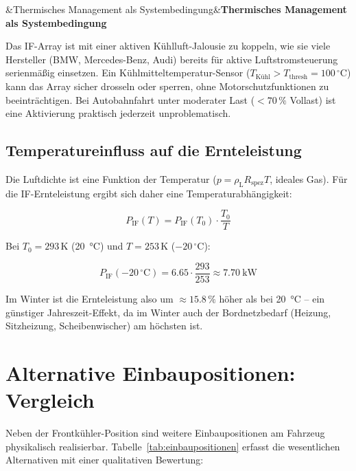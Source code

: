 ﻿\documentclass[12pt, a4paper]{report}
\newenvironment{wichtig}[1][]{%
  \begin{wichtigframe}\sloppy%
  \ifx&#1&\else\textbf{#1}\par\smallskip\fi}{\end{wichtigframe}}
\theoremstyle{definition}
\theoremstyle{remark}
\newcommand{\rhoL}{\rho_{\text{L}}}
\begin{document}
\begin{wichtig}[Thermisches Management als Systembedingung]
  Das IF-Array ist mit einer aktiven Kühlluft-Jalousie zu koppeln, wie sie
  viele Hersteller (BMW, Mercedes-Benz, Audi) bereits für aktive
  Luftstromsteuerung serienmäßig einsetzen. Ein Kühlmitteltemperatur-Sensor
  ($T_{\text{Kühl}} > T_{\text{thresh}} = 100\,^\circ\text{C}$) kann das Array
  sicher drosseln oder sperren, ohne Motorschutzfunktionen zu beeinträchtigen.
  Bei Autobahnfahrt unter moderater Last ($< 70\,\%$ Vollast) ist eine
  Aktivierung praktisch jederzeit unproblematisch.
\end{wichtig}

\subsection{Temperatureinfluss auf die Ernteleistung}

Die Luftdichte ist eine Funktion der Temperatur ($p = \rhoL R_{\text{spez}} T$,
ideales Gas). Für die IF-Ernteleistung ergibt sich daher eine Temperaturabhängigkeit:

\begin{equation}
  P_{\text{IF}}(T) = P_{\text{IF}}(T_0) \cdot \frac{T_0}{T}
  \label{eq:p_if_temp}
\end{equation}

Bei $T_0 = 293\,\text{K}$ (20\, °C) und $T = 253\,\text{K}$ ($-20\,^\circ$C):

\begin{equation}
  P_{\text{IF}}(-20\,^\circ\text{C}) = 6.65 \cdot \frac{293}{253} \approx \SI{7.70}{\kilo\watt}
  \label{eq:p_if_winter}
\end{equation}

Im Winter ist die Ernteleistung also um $\approx 15.8\,\%$ höher als bei
20\, °C -- ein günstiger Jahreszeit-Effekt, da im Winter auch der Bordnetzbedarf
(Heizung, Sitzheizung, Scheiben\-wischer) am höchsten ist.

\section{Alternative Einbaupositionen: Vergleich}
\label{sec:kfz_positionen}

Neben der Frontkühler-Position sind weitere Einbaupositionen am Fahrzeug
physikalisch realisierbar. Tabelle~\ref{tab:einbaupositionen} erfasst die
wesentlichen Alternativen mit einer qualitativen Bewertung:
\end{document}
